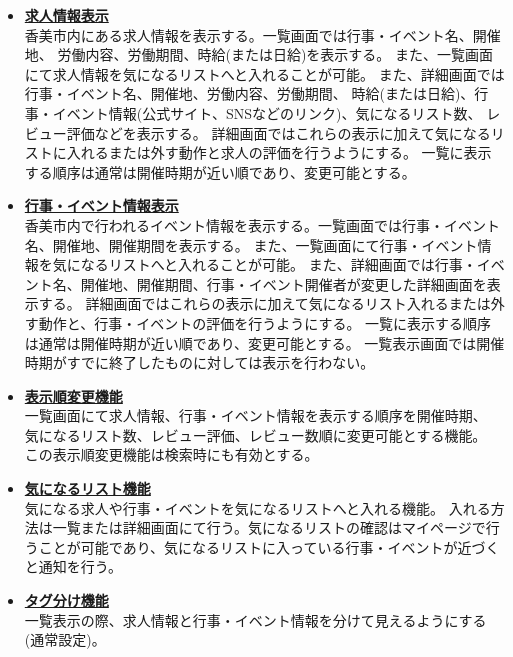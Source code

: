 \documentclass[a4paper,dvipdfmx]{jarticle}
\begin{document}
\begin{itemize}
          \begin{itemize}
              \item[-] \underline{\textbf{求人情報表示}}\\
                  香美市内にある求人情報を表示する。一覧画面では行事・イベント名、開催地、
                  労働内容、労働期間、時給(または日給)を表示する。
                  また、一覧画面にて求人情報を気になるリストへと入れることが可能。
                  また、詳細画面では行事・イベント名、開催地、労働内容、労働期間、
                  時給(または日給)、行事・イベント情報(公式サイト、SNSなどのリンク)、気になるリスト数、
                  レビュー評価などを表示する。
                  詳細画面ではこれらの表示に加えて気になるリストに入れるまたは外す動作と求人の評価を行うようにする。
                  一覧に表示する順序は通常は開催時期が近い順であり、変更可能とする。
              \item[-] \underline{\textbf{行事・イベント情報表示}}\\
                  香美市内で行われるイベント情報を表示する。一覧画面では行事・イベント名、開催地、開催期間を表示する。
                  また、一覧画面にて行事・イベント情報を気になるリストへと入れることが可能。
                  また、詳細画面では行事・イベント名、開催地、開催期間、行事・イベント開催者が変更した詳細画面を表示する。
                  詳細画面ではこれらの表示に加えて気になるリスト入れるまたは外す動作と、行事・イベントの評価を行うようにする。
                  一覧に表示する順序は通常は開催時期が近い順であり、変更可能とする。
                  一覧表示画面では開催時期がすでに終了したものに対しては表示を行わない。
              \item[-] \underline{\textbf{表示順変更機能}}\\
                  一覧画面にて求人情報、行事・イベント情報を表示する順序を開催時期、
                  気になるリスト数、レビュー評価、レビュー数順に変更可能とする機能。
                  この表示順変更機能は検索時にも有効とする。
              \item[-] \underline{\textbf{気になるリスト機能}}\\
                  気になる求人や行事・イベントを気になるリストへと入れる機能。
                  入れる方法は一覧または詳細画面にて行う。気になるリストの確認はマイページで行うことが可能であり、気になるリストに入っている行事・イベントが近づくと通知を行う。
              \item[-] \underline{\textbf{タグ分け機能}}\\
                  一覧表示の際、求人情報と行事・イベント情報を分けて見えるようにする (通常設定)。

\end{itemize}
\end{itemize}
\end{document}
